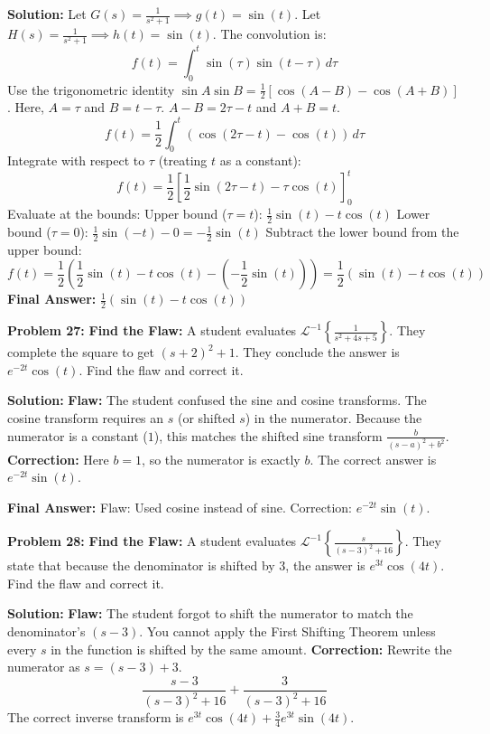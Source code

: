 \documentclass[11pt, letterpaper]{article}
\theoremstyle{definition}
\theoremstyle{remark}
\begin{document}
\textbf{Solution:}
Let $G(s) = \frac{1}{s^2+1} \implies g(t) = \sin(t)$.
Let $H(s) = \frac{1}{s^2+1} \implies h(t) = \sin(t)$.
The convolution is:
\[
f(t) = \int_0^t \sin(\tau)\sin(t-\tau) \, d\tau
\]
Use the trigonometric identity $\sin A \sin B = \frac{1}{2}[\cos(A-B) - \cos(A+B)]$.
Here, $A = \tau$ and $B = t-\tau$.
$A-B = 2\tau - t$ and $A+B = t$.
\[
f(t) = \frac{1}{2} \int_0^t (\cos(2\tau - t) - \cos(t)) \, d\tau
\]
Integrate with respect to $\tau$ (treating $t$ as a constant):
\[
f(t) = \frac{1}{2} \left[ \frac{1}{2}\sin(2\tau - t) - \tau\cos(t) \right]_0^t
\]
Evaluate at the bounds:
Upper bound ($\tau = t$): $\frac{1}{2}\sin(t) - t\cos(t)$
Lower bound ($\tau = 0$): $\frac{1}{2}\sin(-t) - 0 = -\frac{1}{2}\sin(t)$
Subtract the lower bound from the upper bound:
\[
f(t) = \frac{1}{2} \left( \frac{1}{2}\sin(t) - t\cos(t) - \left(-\frac{1}{2}\sin(t)\right) \right) = \frac{1}{2}(\sin(t) - t\cos(t))
\]
\textbf{Final Answer:} $\displaystyle \frac{1}{2}(\sin(t) - t\cos(t))$

\vspace{1em}

\textbf{Problem 27:} \textbf{Find the Flaw:} A student evaluates $\displaystyle \mathcal{L}^{-1} \left\{ \frac{1}{s^2 + 4s + 5} \right\}$. They complete the square to get $(s+2)^2 + 1$. They conclude the answer is $e^{-2t}\cos(t)$. Find the flaw and correct it.

\textbf{Solution:}
\textbf{Flaw:} The student confused the sine and cosine transforms. The cosine transform requires an $s$ (or shifted $s$) in the numerator. Because the numerator is a constant ($1$), this matches the shifted sine transform $\frac{b}{(s-a)^2+b^2}$.
\textbf{Correction:} Here $b=1$, so the numerator is exactly $b$. The correct answer is $e^{-2t}\sin(t)$.

\textbf{Final Answer:} Flaw: Used cosine instead of sine. Correction: $e^{-2t}\sin(t)$.

\vspace{1em}

\textbf{Problem 28:} \textbf{Find the Flaw:} A student evaluates $\displaystyle \mathcal{L}^{-1} \left\{ \frac{s}{(s-3)^2 + 16} \right\}$. They state that because the denominator is shifted by $3$, the answer is $e^{3t}\cos(4t)$. Find the flaw and correct it.

\textbf{Solution:}
\textbf{Flaw:} The student forgot to shift the numerator to match the denominator's $(s-3)$. You cannot apply the First Shifting Theorem unless every $s$ in the function is shifted by the same amount.
\textbf{Correction:} Rewrite the numerator as $s = (s-3) + 3$.
\[
\frac{s-3}{(s-3)^2 + 16} + \frac{3}{(s-3)^2 + 16}
\]
The correct inverse transform is $e^{3t}\cos(4t) + \frac{3}{4}e^{3t}\sin(4t)$.
\end{document}
